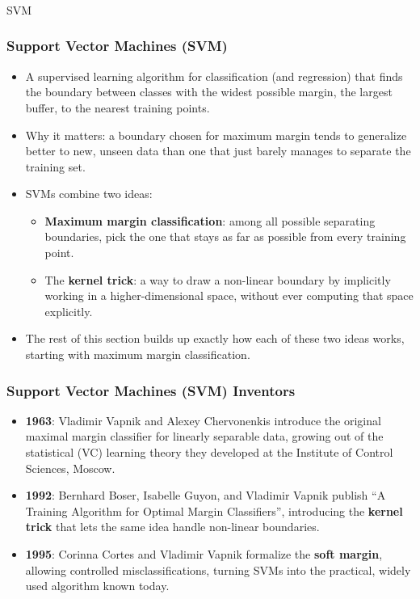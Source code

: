 \begin{frame}[fragile]\frametitle{}
\begin{center}
{\Large SVM}
\end{center}
\end{frame}

\begin{frame}[fragile]\frametitle{Support Vector Machines (SVM)}
\begin{itemize}
\item A supervised learning algorithm for classification (and regression) that finds the boundary between classes with the widest possible margin, the largest buffer, to the nearest training points.
\item Why it matters: a boundary chosen for maximum margin tends to generalize better to new, unseen data than one that just barely manages to separate the training set.
\item SVMs combine two ideas:
\begin{itemize}
\item \textbf{Maximum margin classification}: among all possible separating boundaries, pick the one that stays as far as possible from every training point.
\item The \textbf{kernel trick}: a way to draw a non-linear boundary by implicitly working in a higher-dimensional space, without ever computing that space explicitly.
\end{itemize}
\item The rest of this section builds up exactly how each of these two ideas works, starting with maximum margin classification.
\end{itemize}
\end{frame}

\begin{frame}[fragile]\frametitle{Support Vector Machines (SVM) Inventors}
\begin{itemize}
\item \textbf{1963}: Vladimir Vapnik and Alexey Chervonenkis introduce the original maximal margin classifier for linearly separable data, growing out of the statistical (VC) learning theory they developed at the Institute of Control Sciences, Moscow.
\item \textbf{1992}: Bernhard Boser, Isabelle Guyon, and Vladimir Vapnik publish ``A Training Algorithm for Optimal Margin Classifiers'', introducing the \textbf{kernel trick} that lets the same idea handle non-linear boundaries.
\item \textbf{1995}: Corinna Cortes and Vladimir Vapnik formalize the \textbf{soft margin}, allowing controlled misclassifications, turning SVMs into the practical, widely used algorithm known today.
\end{itemize}
\end{frame}


